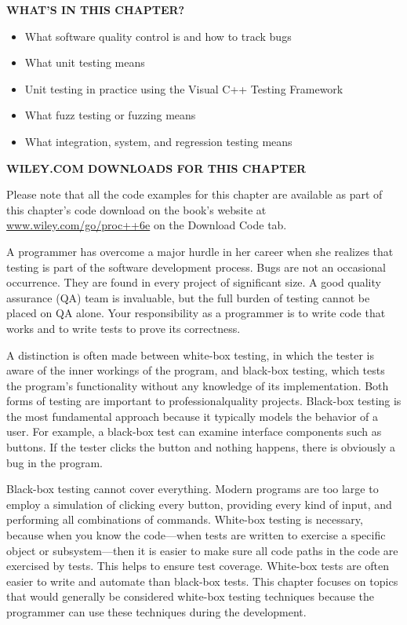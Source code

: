 \noindent
\textbf{WHAT’S IN THIS CHAPTER?}

\begin{itemize}
\item
What software quality control is and how to track bugs

\item
What unit testing means

\item
Unit testing in practice using the Visual C++ Testing Framework

\item
What fuzz testing or fuzzing means

\item
What integration, system, and regression testing means
\end{itemize}

\noindent
\textbf{WILEY.COM DOWNLOADS FOR THIS CHAPTER}

Please note that all the code examples for this chapter are available as part of this chapter’s code download on the book’s website at \url{www.wiley.com/go/proc++6e} on the Download Code tab.

A programmer has overcome a major hurdle in her career when she realizes that testing is part of the software development process. Bugs are not an occasional occurrence. They are found in every project of significant size. A good quality assurance (QA) team is invaluable, but the full burden of testing cannot be placed on QA alone. Your responsibility as a programmer is to write code that works and to write tests to prove its correctness.

A distinction is often made between white-box testing, in which the tester is aware of the inner workings of the program, and black-box testing, which tests the program’s functionality without any knowledge of its implementation. Both forms of testing are important to professionalquality projects. Black-box testing is the most fundamental approach because it typically models the behavior of a user. For example, a black-box test can examine interface components such as buttons. If the tester clicks the button and nothing happens, there is obviously a bug in the program.

Black-box testing cannot cover everything. Modern programs are too large to employ a simulation of clicking every button, providing every kind of input, and performing all combinations of commands. White-box testing is necessary, because when you know the code—when tests are written to exercise a specific object or subsystem—then it is easier to make sure all code paths in the code are exercised by tests. This helps to ensure test coverage. White-box tests are often easier to write and automate than black-box tests. This chapter focuses on topics that would generally be considered white-box testing techniques because the programmer can use these techniques during the development.

